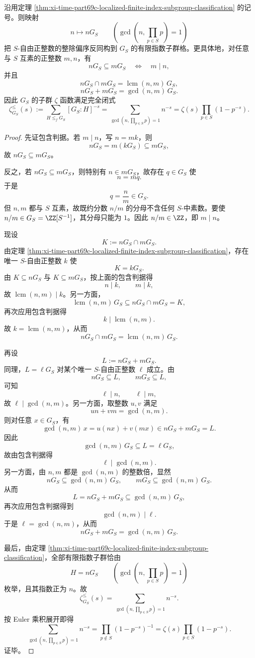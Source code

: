 \begin{corollary}\label{cor:xi-time-part69c-localized-finite-index-lattice-zeta}
沿用定理 \ref{thm:xi-time-part69c-localized-finite-index-subgroup-classification} 的记号。则映射
\[
n\longmapsto nG_S
\qquad
\left(
\gcd\!\left(n,\prod_{p\in S}p\right)=1
\right)
\]
把 \(S\)-自由正整数的整除偏序反同构到 \(G_S\) 的有限指数子群格。更具体地，对任意与 \(S\) 互素的正整数 \(m,n\)，有
\[
nG_S\subseteq mG_S
\quad\Longleftrightarrow\quad
m\mid n,
\]
并且
\[
nG_S\cap mG_S=\operatorname{lcm}(n,m)\,G_S,
\]
\[
nG_S+mG_S=\gcd(n,m)\,G_S.
\]
因此 \(G_S\) 的子群 \(\zeta\) 函数满足完全闭式
\[
\zeta_{G_S}^{\le}(s)
:=
\sum_{H\le_f G_S}[G_S:H]^{-s}
=
\sum_{\gcd(n,\prod_{p\in S}p)=1}n^{-s}
=
\zeta(s)\prod_{p\in S}(1-p^{-s}).
\]
\end{corollary}
\begin{proof}
先证包含判据。若 \(m\mid n\)，写 \(n=mk\)，则
\[
nG_S=m(kG_S)\subseteq mG_S,
\]
故 \(nG_S\subseteq mG_S\)。

反之，若 \(nG_S\subseteq mG_S\)，则特别有 \(n\in mG_S\)，故存在 \(q\in G_S\) 使
\[
n=mq.
\]
于是
\[
q=\frac{n}{m}\in G_S.
\]
但 \(n,m\) 都与 \(S\) 互素，故既约分数 \(n/m\) 的分母不含任何 \(S\)-中素数。要使 \(n/m\in G_S=\ZZ[S^{-1}]\)，其分母只能为 \(1\)。因此 \(n/m\in \ZZ\)，即 \(m\mid n\)。

现设
\[
K:=nG_S\cap mG_S.
\]
由定理 \ref{thm:xi-time-part69c-localized-finite-index-subgroup-classification}，存在唯一 \(S\)-自由正整数 \(k\) 使
\[
K=kG_S.
\]
由 \(K\subseteq nG_S\) 与 \(K\subseteq mG_S\)，按上面的包含判据得
\[
n\mid k,
\qquad
m\mid k,
\]
故 \(\operatorname{lcm}(n,m)\mid k\)。另一方面，
\[
\operatorname{lcm}(n,m)\,G_S\subseteq nG_S\cap mG_S=K,
\]
再次应用包含判据得
\[
k\mid \operatorname{lcm}(n,m).
\]
故 \(k=\operatorname{lcm}(n,m)\)，从而
\[
nG_S\cap mG_S=\operatorname{lcm}(n,m)\,G_S.
\]

再设
\[
L:=nG_S+mG_S.
\]
同理，\(L=\ell G_S\) 对某个唯一 \(S\)-自由正整数 \(\ell\) 成立。由
\[
nG_S\subseteq L,
\qquad
mG_S\subseteq L,
\]
可知
\[
\ell\mid n,
\qquad
\ell\mid m,
\]
故 \(\ell\mid \gcd(n,m)\)。另一方面，取整数 \(u,v\) 满足
\[
un+vm=\gcd(n,m).
\]
则对任意 \(x\in G_S\)，有
\[
\gcd(n,m)\,x=u(nx)+v(mx)\in nG_S+mG_S=L.
\]
因此
\[
\gcd(n,m)\,G_S\subseteq L=\ell G_S,
\]
故由包含判据得
\[
\ell\mid \gcd(n,m).
\]
另一方面，由 \(n,m\) 都是 \(\gcd(n,m)\) 的整数倍，显然
\[
nG_S\subseteq \gcd(n,m)\,G_S,
\qquad
mG_S\subseteq \gcd(n,m)\,G_S.
\]
从而
\[
L=nG_S+mG_S\subseteq \gcd(n,m)\,G_S,
\]
再次应用包含判据得到
\[
\gcd(n,m)\mid \ell.
\]
于是 \(\ell=\gcd(n,m)\)，从而
\[
nG_S+mG_S=\gcd(n,m)\,G_S.
\]

最后，由定理 \ref{thm:xi-time-part69c-localized-finite-index-subgroup-classification}，全部有限指数子群恰由
\[
H=nG_S
\qquad
\left(
\gcd\!\left(n,\prod_{p\in S}p\right)=1
\right)
\]
枚举，且其指数正为 \(n\)。故
\[
\zeta_{G_S}^{\le}(s)
=
\sum_{\gcd(n,\prod_{p\in S}p)=1}n^{-s}.
\]
按 Euler 乘积展开即得
\[
\sum_{\gcd(n,\prod_{p\in S}p)=1}n^{-s}
=
\prod_{p\notin S}(1-p^{-s})^{-1}
=
\zeta(s)\prod_{p\in S}(1-p^{-s}).
\]
证毕。
\end{proof}

